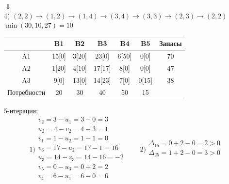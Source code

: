 \documentclass[a4paper, 12pt]{article}
\begin{document}
\begin{center}
  $\Downarrow$\\
  4) $(2,2)\rightarrow(1,2)\rightarrow(1,4)\rightarrow(3,4)\rightarrow(3,3)\rightarrow(2,3)\rightarrow(2,2)$\\
  $\min(30,10,27) = 10$
\end{center}
\begin{table}[H]
\centering
\begin{tabular}{|c|c|c|c|c|c|c|}
\hline
     & B1       & B2       & B3        & B4        & B5        & Запасы \\ \hline
A1   & 15[0]    & 3[20]    & 23[0]     & 6[50]     & 0[0]      & 70     \\ \hline
A2   & 1[20]    & 4[10]    & 17[17]    & 8[0]      & 0[0]      & 47     \\ \hline
A3   & 9[0]     & 13[0]    & 14[23]    & 7[0]      & 0[15]     & 38     \\ \hline
Потребности & 20       & 30       & 40        & 50        & 15        &        \\ \hline
\end{tabular}
\end{table}

5-итерация:\\
\begin{equation*}
  1)\begin{split}
    v_2= 3 - u_1 = 3-0 = 3\\
    u_2= 4 - v_2 = 4-3 = 1\\
    v_1= 1 - u_2 = 1-1 = 0\\
    v_3= 17 - u_2 = 17-1 = 16\\
    u_3= 14 - v_3 = 14-16 = -2\\
    v_5= 0 - u_3 = 0+2 = 2\\
    v_4= 6 - u_1 = 6-0 = 6\\
  \end{split}
  \qquad  
  2)\begin{split}
    \Delta_{15} =0+2-0=2> 0 \\
    \Delta_{25} =1+2-0=3> 0 \\
  \end{split}
\end{equation*}
\end{document}
